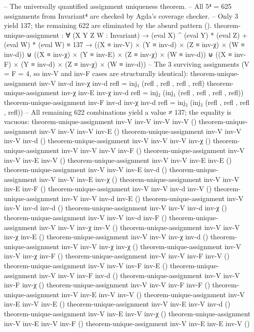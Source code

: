 \documentclass[11pt,a4paper]{article}
\begin{document}
\begin{code}
-- The universally quantified assignment uniqueness theorem.
-- All 5⁴ = 625 assignments from Invariant⁴ are checked by Agda's coverage checker.
-- Only 3 yield 137; the remaining 622 are eliminated by the absurd pattern ().
theorem-unique-assignment : ∀ (X Y Z W : Invariant) →
  (eval X) ^ (eval Y) * (eval Z) + (eval W) * (eval W) ≡ 137 →
  ((X ≡ inv-V) × (Y ≡ inv-d) × (Z ≡ inv-χ) × (W ≡ inv-d))
  ⊎ ((X ≡ inv-χ) × (Y ≡ inv-E) × (Z ≡ inv-χ) × (W ≡ inv-d))
  ⊎ ((X ≡ inv-F) × (Y ≡ inv-d) × (Z ≡ inv-χ) × (W ≡ inv-d))
-- The 3 surviving assignments (V = F = 4, so inv-V and inv-F cases are structurally identical):
theorem-unique-assignment inv-V inv-d inv-χ inv-d refl = inj₁ (refl , refl , refl , refl)
theorem-unique-assignment inv-χ inv-E inv-χ inv-d refl = inj₂ (inj₁ (refl , refl , refl , refl))
theorem-unique-assignment inv-F inv-d inv-χ inv-d refl = inj₂ (inj₂ (refl , refl , refl , refl))
-- All remaining 622 combinations yield a value ≠ 137; the equality is vacuous:
theorem-unique-assignment inv-V inv-V inv-V inv-V ()
theorem-unique-assignment inv-V inv-V inv-V inv-E ()
theorem-unique-assignment inv-V inv-V inv-V inv-d ()
theorem-unique-assignment inv-V inv-V inv-V inv-χ ()
theorem-unique-assignment inv-V inv-V inv-V inv-F ()
theorem-unique-assignment inv-V inv-V inv-E inv-V ()
theorem-unique-assignment inv-V inv-V inv-E inv-E ()
theorem-unique-assignment inv-V inv-V inv-E inv-d ()
theorem-unique-assignment inv-V inv-V inv-E inv-χ ()
theorem-unique-assignment inv-V inv-V inv-E inv-F ()
theorem-unique-assignment inv-V inv-V inv-d inv-V ()
theorem-unique-assignment inv-V inv-V inv-d inv-E ()
theorem-unique-assignment inv-V inv-V inv-d inv-d ()
theorem-unique-assignment inv-V inv-V inv-d inv-χ ()
theorem-unique-assignment inv-V inv-V inv-d inv-F ()
theorem-unique-assignment inv-V inv-V inv-χ inv-V ()
theorem-unique-assignment inv-V inv-V inv-χ inv-E ()
theorem-unique-assignment inv-V inv-V inv-χ inv-d ()
theorem-unique-assignment inv-V inv-V inv-χ inv-χ ()
theorem-unique-assignment inv-V inv-V inv-χ inv-F ()
theorem-unique-assignment inv-V inv-V inv-F inv-V ()
theorem-unique-assignment inv-V inv-V inv-F inv-E ()
theorem-unique-assignment inv-V inv-V inv-F inv-d ()
theorem-unique-assignment inv-V inv-V inv-F inv-χ ()
theorem-unique-assignment inv-V inv-V inv-F inv-F ()
theorem-unique-assignment inv-V inv-E inv-V inv-V ()
theorem-unique-assignment inv-V inv-E inv-V inv-E ()
theorem-unique-assignment inv-V inv-E inv-V inv-d ()
theorem-unique-assignment inv-V inv-E inv-V inv-χ ()
theorem-unique-assignment inv-V inv-E inv-V inv-F ()
theorem-unique-assignment inv-V inv-E inv-E inv-V ()

\end{code}
\end{document}
